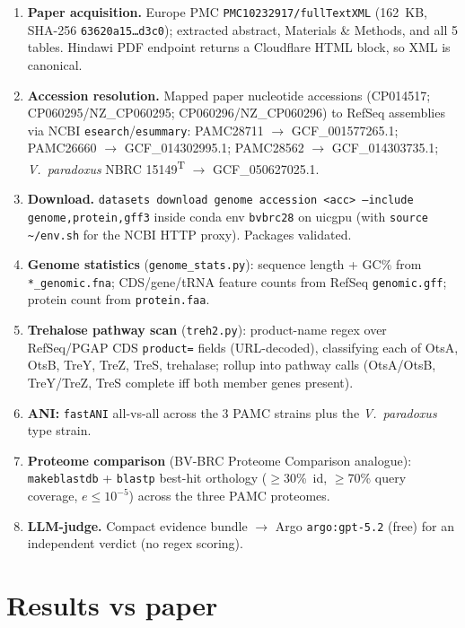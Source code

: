 \documentclass[11pt]{article}
\begin{document}
\begin{enumerate}[leftmargin=1.4em]
  \item \textbf{Paper acquisition.} Europe PMC \texttt{PMC10232917/fullTextXML}
        (162~KB, SHA-256 \texttt{63620a15\ldots d3c0}); extracted abstract, Materials \& Methods,
        and all 5 tables. Hindawi PDF endpoint returns a Cloudflare HTML block, so XML is canonical.
  \item \textbf{Accession resolution.} Mapped paper nucleotide accessions (CP014517;
        CP060295/NZ\_CP060295; CP060296/NZ\_CP060296) to RefSeq assemblies via
        NCBI \texttt{esearch}/\texttt{esummary}:
        PAMC28711 $\to$ GCF\_001577265.1;
        PAMC26660 $\to$ GCF\_014302995.1;
        PAMC28562 $\to$ GCF\_014303735.1;
        \emph{V.\ paradoxus} NBRC 15149\textsuperscript{T} $\to$ GCF\_050627025.1.
  \item \textbf{Download.} \texttt{datasets download genome accession <acc> --include
        genome,protein,gff3} inside conda env \texttt{bvbrc28} on uicgpu (with
        \texttt{source \textasciitilde/env.sh} for the NCBI HTTP proxy). Packages validated.
  \item \textbf{Genome statistics} (\texttt{genome\_stats.py}): sequence length + GC\% from
        \texttt{*\_genomic.fna}; CDS/gene/tRNA feature counts from RefSeq \texttt{genomic.gff};
        protein count from \texttt{protein.faa}.
  \item \textbf{Trehalose pathway scan} (\texttt{treh2.py}): product-name regex over RefSeq/PGAP
        CDS \texttt{product=} fields (URL-decoded), classifying each of OtsA, OtsB, TreY, TreZ,
        TreS, trehalase; rollup into pathway calls (OtsA/OtsB, TreY/TreZ, TreS complete iff
        both member genes present).
  \item \textbf{ANI:} \texttt{fastANI} all-vs-all across the 3 PAMC strains plus the
        \emph{V.\ paradoxus} type strain.
  \item \textbf{Proteome comparison} (BV-BRC Proteome Comparison analogue): \texttt{makeblastdb}
        + \texttt{blastp} best-hit orthology ($\geq$30\%~id, $\geq$70\% query coverage,
        $e \leq 10^{-5}$) across the three PAMC proteomes.
  \item \textbf{LLM-judge.} Compact evidence bundle $\to$ Argo \texttt{argo:gpt-5.2} (free) for an
        independent verdict (no regex scoring).
\end{enumerate}

\section{Results vs paper}
\end{document}
